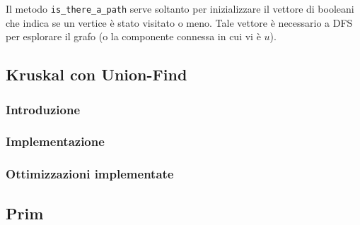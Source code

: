 Il metodo \verb|is_there_a_path| serve soltanto per inizializzare
il vettore di booleani che indica se un vertice è stato visitato o meno.
Tale vettore è necessario a DFS per esplorare il grafo (o la
componente connessa in cui vi è $u$).

\subsection{Kruskal con Union-Find}

\subsubsection{Introduzione}

\subsubsection{Implementazione}

\subsubsection{Ottimizzazioni implementate}

\subsection{Prim}